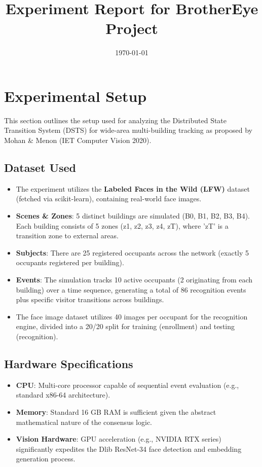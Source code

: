 \documentclass[12pt,a4paper]{article}
\title{Experiment Report for BrotherEye Project}
\author{}
\date{\today}
\begin{document}
\maketitle

\section{Experimental Setup}

This section outlines the setup used for analyzing the Distributed State Transition System (DSTS) for wide-area multi-building tracking as proposed by Mohan \& Menon (IET Computer Vision 2020).

\subsection*{Dataset Used}
\begin{itemize}
    \item The experiment utilizes the \textbf{Labeled Faces in the Wild (LFW)} dataset (fetched via scikit-learn), containing real-world face images.
    \item \textbf{Scenes \& Zones}: 5 distinct buildings are simulated (B0, B1, B2, B3, B4). Each building consists of 5 zones (z1, z2, z3, z4, zT), where 'zT' is a transition zone to external areas. 
    \item \textbf{Subjects}: There are 25 registered occupants across the network (exactly 5 occupants registered per building).
    \item \textbf{Events}: The simulation tracks 10 active occupants (2 originating from each building) over a time sequence, generating a total of 86 recognition events plus specific visitor transitions across buildings.
    \item The face image dataset utilizes 40 images per occupant for the recognition engine, divided into a 20/20 split for training (enrollment) and testing (recognition).
\end{itemize}

\subsection*{Hardware Specifications}
\begin{itemize}
    \item \textbf{CPU}: Multi-core processor capable of sequential event evaluation (e.g., standard x86-64 architecture).
    \item \textbf{Memory}: Standard 16 GB RAM is sufficient given the abstract mathematical nature of the consensus logic.
    \item \textbf{Vision Hardware}: GPU acceleration (e.g., NVIDIA RTX series) significantly expedites the Dlib ResNet-34 face detection and embedding generation process.
\end{itemize}
\end{document}
